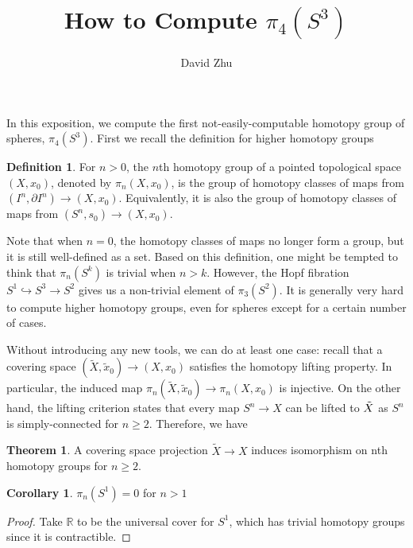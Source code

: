 \documentclass{article}
\title{How to Compute $\pi_4(S^3)$}
\author{David Zhu}
\theoremstyle{definition}
\newtheorem{theorem}{Theorem}[section]
\theoremstyle{definition}
\theoremstyle{definition}
\theoremstyle{definition}
\theoremstyle{definition}
\newtheorem{definition}{Definition}[section]
\theoremstyle{definition}
\newtheorem{corollary}{Corollary}[theorem]
\theoremstyle{definition}
\begin{document}
\maketitle


In this exposition, we compute the first not-easily-computable homotopy group of spheres, $\pi_4(S^3)$. First we recall the definition for higher homotopy groups

\begin{tcolorbox}[colback=purple!5!white,colframe=purple!75!black]
\begin{definition}
For $n>0$, the  $n$th homotopy group of a pointed topological space $(X,x_0)$, denoted by $\pi_n(X,x_0)$, is the group of homotopy classes of maps from $(I^n,\partial I^n)\to (X,x_0)$. Equivalently, it is also the group of homotopy classes of maps from $(S^n,s_0)\to (X,x_0)$. 
\end{definition}
\end{tcolorbox}
Note that when $n=0$, the homotopy classes of maps no longer form a group, but it is still well-defined as a set. Based on this definition, one might be tempted to think that $\pi_n(S^k)$ is trivial when $n>k$. However, the Hopf fibration $S^1\hookrightarrow S^3\to S^2$ gives us a non-trivial element of $\pi_3(S^2)$. It is generally very hard to compute higher homotopy groups, even for spheres except for a certain number of cases.

Without introducing any new tools, we can do at least one case: recall that a covering space $(\tilde{X},\tilde{x}_0)\to (X,x_0)$ satisfies the homotopy lifting property. In particular, the induced map $\pi_n(\tilde{X},\tilde{x}_0)\to \pi_n(X,x_0)$ is injective. On the other hand, the lifting criterion states that every map $S^n\to X$ can be lifted to $\Tilde{X}$ as $S^n$ is simply-connected for $n\geq 2$. Therefore, we have

\begin{tcolorbox}[colback=red!5!white,colframe=red!30!white]
\begin{theorem}
A covering space projection $\tilde{X}\to X$ induces isomorphism on nth homotopy groups for $n\geq 2$.
\end{theorem}
\end{tcolorbox}

\begin{tcolorbox}[colback=green!5!white,colframe=green!30!white]
\begin{corollary}
    $\pi_n(S^1)=0$ for $n>1$
\end{corollary}
\end{tcolorbox}
\begin{proof}
    Take $\mathbb{R}$ to be the universal cover for $S^1$, which has trivial homotopy groups since it is contractible.
\end{proof}
\end{document}
